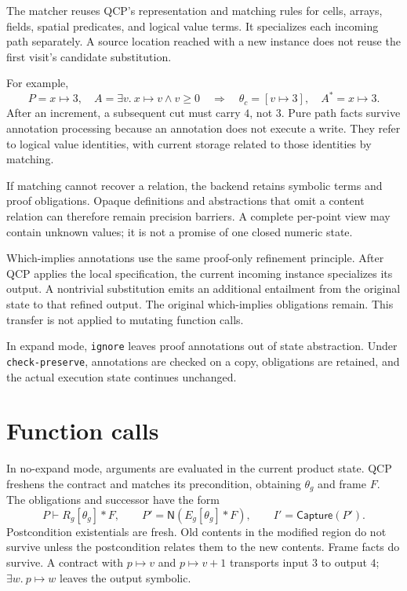 \documentclass[10pt]{article}
\newcommand{\Norm}{\mathsf{N}}
\newcommand{\Capture}{\mathsf{Capture}}
\begin{document}
The matcher reuses QCP's representation and matching rules for cells, arrays,
fields, spatial predicates, and logical value terms. It specializes each
incoming path separately. A source location reached with a new instance does
not reuse the first visit's candidate substitution.

For example,
\[
 P=x\mapsto3,\quad A=\exists v.\ x\mapsto v\land v\ge0
 \quad\Rightarrow\quad \theta_c=[v\mapsto3],\quad A^*=x\mapsto3.
\]
After an increment, a subsequent cut must carry $4$, not $3$. Pure path facts
survive annotation processing because an annotation does not execute a write.
They refer to logical value identities, with current storage related to those
identities by matching.

If matching cannot recover a relation, the backend retains symbolic terms and
proof obligations. Opaque definitions and abstractions that omit a content
relation can therefore remain precision barriers. A complete per-point view
may contain unknown values; it is not a promise of one closed numeric state.

Which-implies annotations use the same proof-only refinement principle.
After QCP applies the local specification, the current incoming instance
specializes its output. A nontrivial substitution emits an additional
entailment from the original state to that refined output. The original
which-implies obligations remain. This transfer is not applied to mutating
function calls.

In expand mode, \texttt{ignore} leaves proof annotations out of state
abstraction. Under \texttt{check-preserve}, annotations are checked on a copy,
obligations are retained, and the actual execution state continues unchanged.

\section{Function calls}
In no-expand mode, arguments are evaluated in the current product state.
QCP freshens the contract and matches its precondition, obtaining $\theta_g$
and frame $F$. The obligations and successor have the form
\[
 P\vdash R_g[\theta_g]*F,
 \qquad P'=\Norm(E_g[\theta_g]*F),\qquad I'=\Capture(P').
\]
Postcondition existentials are fresh. Old contents in the modified region do
not survive unless the postcondition relates them to the new contents. Frame
facts do survive. A contract with $p\mapsto v$ and $p\mapsto v+1$ transports
input $3$ to output $4$; $\exists w.\ p\mapsto w$ leaves the output symbolic.
\end{document}
